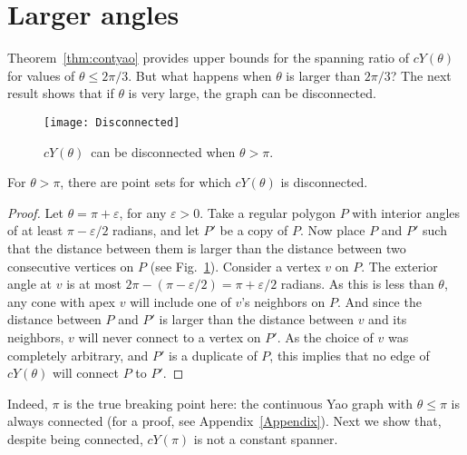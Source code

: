\documentclass{cccg14}
\newcommand{\cyao}{\ensuremath{cY(\theta)}\xspace}
\newcommand{\cyaopi}{\ensuremath{cY(\pi)}\xspace}
\begin{document}
\vspace{-1.5em}
\section{Larger angles}\label{Section:Other angles}

\vspace{-0.5em}
Theorem~\ref{thm:contyao} provides upper bounds for the spanning ratio of $\cyao$ for values of $\theta\leq 2\pi/3$.
But what happens when $\theta$ is larger than $2\pi/3$?
The next result shows that if $\theta$ is very large, the graph can be disconnected.

\begin{figure}[ht]
 \centering
 \texttt{[image: Disconnected]}
 \caption{\small  \cyao\ can be disconnected when $\theta > \pi$.}
 \label{fig:Disconnected}
\end{figure}

\vspace{-0.5em}
\begin{theorem}
 For $\theta > \pi$, there are point sets for which \cyao is disconnected.
\end{theorem}
\begin{proof}
 Let $\theta = \pi + \varepsilon$, for any $\varepsilon > 0$. Take a regular polygon $P$ with interior angles of at least $\pi - \varepsilon/2$ radians, and let $P'$ be a copy of $P$. Now place $P$ and $P'$ such that the distance between them is larger than the distance between two consecutive vertices on $P$ (see Fig.~\ref{fig:Disconnected}). Consider a vertex $v$ on $P$. The exterior angle at $v$ is at most $2\pi - (\pi - \varepsilon/2) = \pi + \varepsilon/2$ radians. As this is less than $\theta$, any cone with apex $v$ will include one of $v$'s neighbors on $P$. And since the distance between $P$ and $P'$ is larger than the distance between $v$ and its neighbors, $v$ will never connect to a vertex on $P'$. As the choice of $v$ was completely arbitrary, and $P'$ is a duplicate of $P$, this implies that no edge of \cyao will connect $P$ to $P'$.
\end{proof}


Indeed, $\pi$ is the true breaking point here: the continuous Yao graph with $\theta \leq \pi$ is always connected (for a proof, see Appendix~\ref{Appendix}).
Next we show that, despite being connected, $\cyaopi$ is not a constant spanner.
\end{document}
